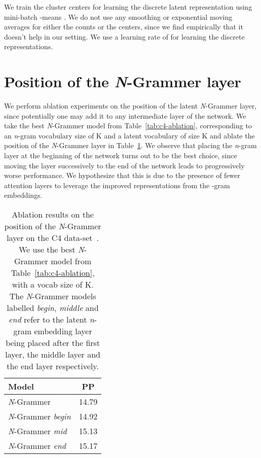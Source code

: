 \documentclass[11pt]{article}
\begin{document}
We train the cluster centers for learning the discrete latent 
representation using mini-batch -means 
\citep{bottou1995convergence}. We do not use
any smoothing or exponential moving averages for either the counts or the centers, since we find 
empirically that it doesn't help in our setting. 
We use a learning rate of  for learning the
discrete representations.

\section{Position of the \textit{N}-Grammer layer}\label{sec:position_ablations}
We perform ablation experiments on the position of the
latent \textit{N}-Grammer layer, 
since potentially one may add it to any intermediate layer
of the network. We take the best \textit{N}-Grammer
model from Table~\ref{tab:c4-ablation}, corresponding to
an \textit{n}-gram vocabulary size of K and a latent
vocabulary of size K and ablate the position of
the \textit{N}-Grammer layer in Table~\ref{tab:position-ablation}. We observe that placing
the \textit{n}-gram layer at the beginning of the network
turns out to be the best choice, since moving the layer 
successively to the end of the network leads to progressively worse performance. We hypothesize
that this is due to the presence of 
fewer attention layers to leverage the improved 
representations from the -gram embeddings.
\begin{table}[ht]
\centering
\begin{tabular}{lc}
\toprule
       Model &  PP \\
       \midrule
        \textit{N}-Grammer & 14.79 \\ 
        \textit{N}-Grammer \textit{begin} & 14.92 \\ 
        \textit{N}-Grammer \textit{mid} & 15.13\\
        \textit{N}-Grammer \textit{end} & 15.17\\
    \bottomrule
    \end{tabular}
    \vspace{1mm}
    \caption{Ablation results on the position of the 
    \textit{N}-Grammer layer on the C4 
    data-set~\citep{raffel2019exploring}. We use the best
    \textit{N}-Grammer model from Table~\ref{tab:c4-ablation},
    with a vocab size of K. The \textit{N}-Grammer
    models labelled \textit{begin}, \textit{middle} and \textit{end} refer to the latent \textit{n}-gram 
    embedding layer being placed after the first layer,
    the middle layer and the end layer respectively.}
    \label{tab:position-ablation}
\end{table}
\end{document}
